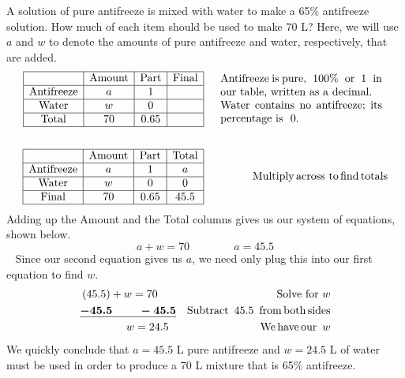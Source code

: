 \begin{example}  
  A solution of pure antifreeze is mixed with water to make a 65\% antifreeze
  solution. How much of each item should be used to make 70 L?\pp
	Here, we will use $a$ and $w$ to denote the amounts of pure antifreeze and water, respectively, that are added.
  \begin{eqnarray*}
    \begin{array}{|c|c|c|c|}
      \hline
      & \tmop{Amount} & \tmop{Part} & \tmop{Final}\\
      \hline
      \tmop{Antifreeze} & a & 1 & \\
      \hline
      \tmop{Water} & w & 0 & \\
      \hline
      \tmop{Total} & 70 & 0.65 & \\
      \hline
    \end{array} &  & \begin{array}{p{0.425\textwidth}}
      \tmop{Antifreeze}
      \tmop{is} \tmop{pure,~} 100\% \tmop{~or~} 1 \tmop{~in} \tmop{our}
      \tmop{table}, \tmop{written} \tmop{as~a}
      \tmop{decimal}.\\
			\tmop{Water} \tmop{contains} \tmop{no} \tmop{antifreeze;}
      \tmop{its}
      \tmop{percentage} \tmop{is~} 0.
    \end{array}\\
    &  & \\
    \begin{array}{|c|c|c|c|}
      \hline
      & \tmop{Amount} & \tmop{Part} & \tmop{Total}\\
      \hline
      \tmop{Antifreeze} & a & 1 & a\\
      \hline
      \tmop{Water} & w & 0 & 0\\
      \hline
      \tmop{Final} & 70 & 0.65 & 45.5\\
      \hline
    \end{array} &  & \tmop{Multiply} \tmop{across~to} \tmop{find} \tmop{totals}
		  \end{eqnarray*}
Adding up the Amount and the Total columns gives us our system of equations, shown below.
$$a + w = 70\qquad\qquad a = 45.5$$
~\pp
Since our second equation gives us $a$, we need only plug this into our first equation to find $w$.
\begin{eqnarray*}
    (45.5) + w = 70~~~~~ &  & \text{Solve for~} w\\
    \boldsymbol{\underline{- 45.5 ~~~~~~~- 45.5}} &  & \operatorname{Subtract~} 45.5 \operatorname{~from} \operatorname{both}
    \operatorname{sides}\\
    w = 24.5~~ &  & \operatorname{We} \operatorname{have} \operatorname{our~} w
	\end{eqnarray*}	
We quickly conclude that $a=45.5$ L pure antifreeze and $w=24.5$ L of water must be used in order to produce a 70 L mixture that is 65\% antifreeze.  
\end{example}

